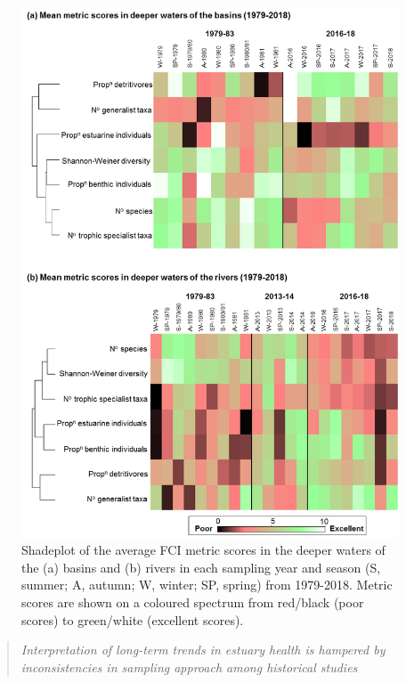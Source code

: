 \documentclass[
]{book}
\begin{document}
\begin{figure}
\includegraphics[width=0.95\linewidth]{images/fish_ecology/picture9} \caption{Shadeplot of the average FCI metric scores in the deeper waters of the (a) basins and (b) rivers in each sampling year and season (S, summer; A, autumn; W, winter; SP, spring) from 1979-2018. Metric scores are shown on a coloured spectrum from red/black (poor scores) to green/white (excellent scores).}\label{fig:fish-ecology-pic9}
\end{figure}

\begin{quote}
\emph{Interpretation of long-term trends in estuary health is hampered by inconsistencies in sampling approach among historical studies}
\end{quote}
\end{document}

